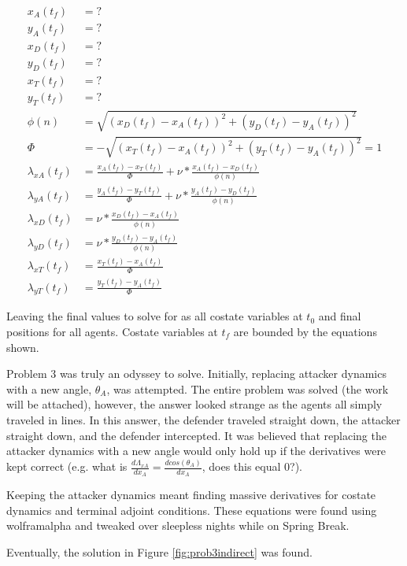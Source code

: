 \documentclass[12pt,letterpaper]{article}
\begin{document}
\begin{equation}
\begin{aligned}
\label{eq:2}
x_A(t_f) &= ? \\
y_A(t_f) &= ? \\
x_D(t_f) &= ? \\
y_D(t_f) &= ? \\
x_T(t_f) &= ? \\
y_T(t_f) &= ? \\
\phi(n) &= \sqrt{ (x_D(t_f) - x_A(t_f))^2 + (y_D(t_f) - y_A(t_f))^2 } \\
\Phi &= -\sqrt{ (x_T(t_f) - x_A(t_f))^2 + (y_T(t_f) - y_A(t_f))^2 } = 1 \\
\lambda_{xA}(t_f) &= \frac{x_A(t_f) - x_T(t_f)}{\Phi} + \nu*\frac{x_A(t_f) - x_D(t_f)}{\phi(n)}\\
\lambda_{yA}(t_f) &= \frac{y_A(t_f) - y_T(t_f)}{\Phi} + \nu*\frac{y_A(t_f) - y_D(t_f)}{\phi(n)} \\
\lambda_{xD}(t_f) &= \nu*\frac{x_D(t_f) - x_A(t_f)}{\phi(n)} \\
\lambda_{yD}(t_f) &= \nu*\frac{y_D(t_f) - y_A(t_f)}{\phi(n)} \\
\lambda_{xT}(t_f) &= \frac{x_T(t_f) - x_A(t_f)}{\Phi} \\
\lambda_{yT}(t_f) &= \frac{y_T(t_f) - y_A(t_f)}{\Phi} 
\end{aligned}
\end{equation}

Leaving the final values to solve for as all costate variables at $t_0$ and final positions for all agents. Costate variables at $t_f$ are bounded by the equations shown. 

Problem 3 was truly an odyssey to solve. Initially, replacing attacker dynamics with a new angle, $\theta_A$, was attempted. The entire problem was solved (the work will be attached), however, the answer looked strange as the agents all simply traveled in lines. In this answer, the defender traveled straight down, the attacker straight down, and the defender intercepted. It was believed that replacing the attacker dynamics with a new angle would only hold up if the derivatives were kept correct (e.g. what is $\frac{d\Lambda_{xA}}{dx_A} = \frac{dcos(\theta_A)}{dx_A}$, does this equal 0?). 

Keeping the attacker dynamics meant finding massive derivatives for costate dynamics and terminal adjoint conditions. These equations were found using wolframalpha and tweaked over sleepless nights while on Spring Break.

Eventually, the solution in Figure \ref{fig:prob3indirect} was found.
\end{document}
